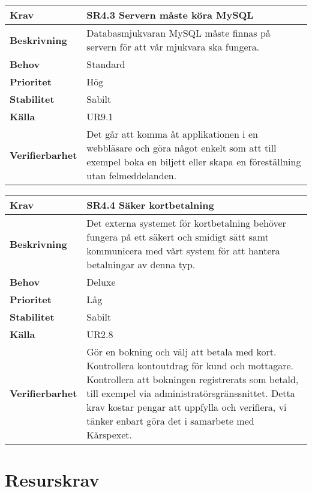 \documentclass[a4paper, twoside, 11pt, titlepage]{article}
\begin{document}
\begin{tabular} { p{2.6cm} p{12.5cm} }
	\hline
	\sffamily\textbf{Krav} & \sffamily\textbf{SR4.3 Servern måste köra MySQL } \\
	\hline
	\sffamily\textbf{Beskrivning} & Databasmjukvaran MySQL måste finnas på servern för att vår mjukvara ska fungera.  \\
	\hline
	\sffamily\textbf{Behov} & Standard  \\
	\hline
	\sffamily\textbf{Prioritet} & Hög  \\
	\hline
	\sffamily\textbf{Stabilitet} & Sabilt  \\
	\hline
	\sffamily\textbf{Källa} & UR9.1  \\
	\hline
	\sffamily\textbf{Verifierbarhet} & Det går att komma åt applikationen i en webbläsare och göra något enkelt som att till exempel boka en biljett eller skapa en föreställning utan felmeddelanden.  \\
	\hline
\end{tabular}
\vspace{6mm}

\begin{tabular} { p{2.6cm} p{12.5cm} }
	\hline
	\sffamily\textbf{Krav} & \sffamily\textbf{SR4.4 Säker kortbetalning } \\
	\hline
	\sffamily\textbf{Beskrivning} & Det externa systemet för kortbetalning behöver fungera på ett säkert och smidigt sätt samt kommunicera med vårt system för att hantera betalningar av denna typ.  \\
	\hline
	\sffamily\textbf{Behov} & Deluxe  \\
	\hline
	\sffamily\textbf{Prioritet} & Låg  \\
	\hline
	\sffamily\textbf{Stabilitet} & Sabilt  \\
	\hline
	\sffamily\textbf{Källa} & UR2.8  \\
	\hline
	\sffamily\textbf{Verifierbarhet} & Gör en bokning och välj att betala med kort. Kontrollera kontoutdrag för kund och mottagare. Kontrollera att bokningen registrerats som betald, till exempel via administratörsgränssnittet. Detta krav kostar pengar att uppfylla och verifiera, vi tänker enbart göra det i samarbete med Kårspexet.  \\
	\hline
\end{tabular}


\clearpage
\section{Resurskrav}
\end{document}
